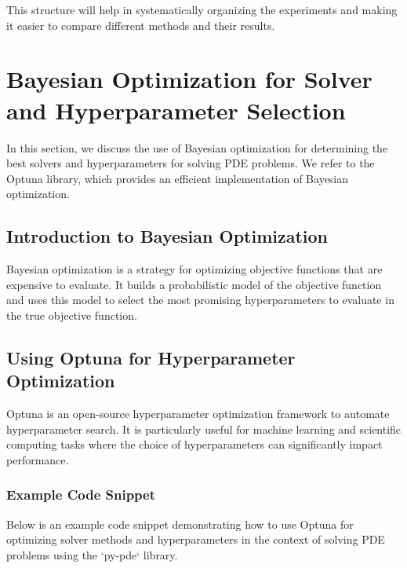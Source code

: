 \documentclass{article}
\begin{document}
This structure will help in systematically organizing the experiments and making it easier to compare different methods and their results.

\section{Bayesian Optimization for Solver and Hyperparameter Selection}
In this section, we discuss the use of Bayesian optimization for determining the best solvers and hyperparameters for solving PDE problems. We refer to the Optuna library, which provides an efficient implementation of Bayesian optimization.

\subsection{Introduction to Bayesian Optimization}
Bayesian optimization is a strategy for optimizing objective functions that are expensive to evaluate. It builds a probabilistic model of the objective function and uses this model to select the most promising hyperparameters to evaluate in the true objective function.

\subsection{Using Optuna for Hyperparameter Optimization}
Optuna is an open-source hyperparameter optimization framework to automate hyperparameter search. It is particularly useful for machine learning and scientific computing tasks where the choice of hyperparameters can significantly impact performance.

\subsubsection{Example Code Snippet}
Below is an example code snippet demonstrating how to use Optuna for optimizing solver methods and hyperparameters in the context of solving PDE problems using the `py-pde` library.
\end{document}
